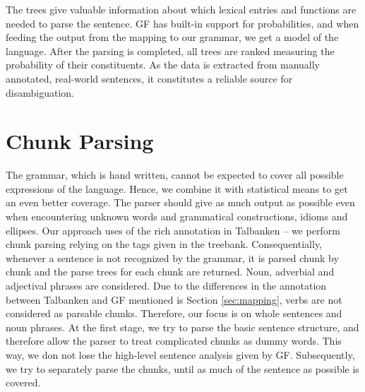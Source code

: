 \documentclass[runningheads,a4paper]{llncs}
\begin{document}
The trees give valuable 
information about which lexical entries and functions
are needed to parse the sentence.
GF has built-in support for probabilities, and when feeding the output
from the mapping to our grammar, we get a model of the language. 
After the parsing is completed, all trees are ranked measuring the
probability of their constituents.
As the data is extracted from manually annotated, real-world sentences,
it constitutes a reliable source for disambiguation.


\section{Chunk Parsing}
\label{sec:chunk}
The grammar, which is hand written, cannot be expected to cover all
possible expressions of the language.
Hence, we combine it with statistical means to get an even better coverage. 
The parser should give as much output as possible 
even when encountering unknown words and grammatical constructions,
idioms and ellipses.
Our approach uses of the rich annotation in Talbanken -- we perform chunk parsing
relying on the tags given in the treebank. 
Consequentially, whenever a sentence is not recognized by the grammar, it is 
parsed chunk by chunk and the parse trees for each chunk are returned.
Noun, adverbial and adjectival phrases are considered.
Due to the differences in the annotation between Talbanken and
GF mentioned is Section \ref{sec:mapping}, verbs are not considered
as parsable chunks. %
Therefore, our focus is on whole sentences and noun phrases. At the first stage,
we try to parse the basic sentence structure, and therefore allow the parser
to treat complicated chunks as dummy words. This way, we don not lose the 
high-level sentence analysis given by GF.
Subsequently, we try to separately parse the chunks,
until as much of the sentence as possible is covered. 



\end{document}
